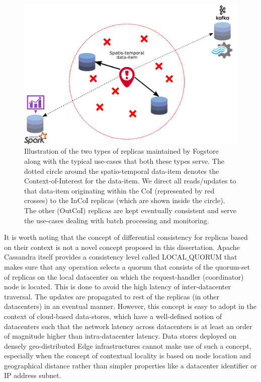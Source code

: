 \begin{figure}[h]
\centering
\includegraphics[width=0.8\columnwidth]{figures/fogstore/architecture.pdf}
\caption{Illustration of the two types of replicas maintained by Fogstore along with the typical use-cases that both these types serve. The dotted circle around the spatio-temporal data-item denotes the Context-of-Interest for the data-item. We direct all reads/updates to that data-item originating within the CoI (represented by red crosses) to the InCoI replicas (which are shown inside the circle). The other (OutCoI) replicas are kept eventually consistent and serve the use-cases dealing with batch processing and monitoring.}
\label{fig:architecture}
\end{figure}

\par It is worth noting that the concept of differential consistency for replicas based on their context is not a novel concept proposed in this dissertation. Apache Cassandra itself provides a consistency level called LOCAL$\_$QUORUM \cite{localquorum} that makes sure that any operation selects a quorum that consists of the quorum-set of replicas on the local datacenter on which the request-handler (coordinator) node is located. This is done to avoid the high latency of inter-datacenter traversal. The updates are propagated to rest of the replicas (in other datacenters) in an eventual manner. However, this concept is easy to adopt in the context of cloud-based data-stores, which have a well-defined notion of datacenters such that the network latency across datacenters is at least an order of magnitude higher than intra-datacenter latency. Data stores deployed on densely geo-distributed Edge infrastructures cannot make use of such a concept, especially when the concept of contextual locality is based on node location and geographical distance rather than simpler properties like a datacenter identifier or IP address subnet. 

